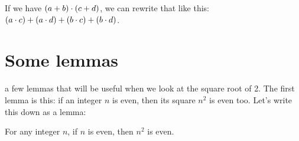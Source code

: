 \documentclass[../../../main.tex]{subfiles}
\begin{document}
\begin{fact}
  \label{fact:distribution-is-allowed}
  If we have $(a + b) \mult/ (c + d)$, we can rewrite that like this: $(a \mult/ c) + (a \mult/ d) + (b \mult/ c) + (b \mult/ d)$.
\end{fact}


\section{Some lemmas}

 a few lemmas that will be useful when we look at the square root of 2. The first lemma is this: if an integer $n$ is even, then its square $n^{2}$ is even too. Let's write this down as a lemma:

\begin{lemma}
  \label{lemma:if-n-is-even-then-n-squared-is-even}
  For any integer $n$, if $n$ is even, then $n^{2}$ is even.
\end{lemma}
\end{document}
